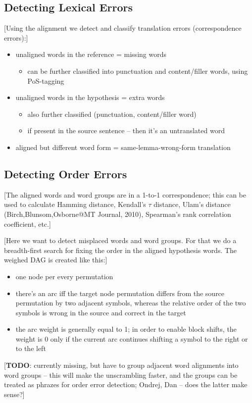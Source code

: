 \documentclass[11pt]{article}
\newcommand{\tmp}[1]{[#1]}
\newcommand{\todo}[0]{\textbf{TODO}}
\newcommand{\itemz}{\begin{itemize}}
\newcommand{\idone}{\end{itemize}}
\newcommand{\oneitem}[1]{\itemz \item #1 \idone}
\begin{document}
\subsection{Detecting Lexical Errors}

\tmp{Using the alignment we detect and classify translation errors (correspondence errors):}

\itemz
	\item unaligned words in the reference = missing words
		\oneitem{can be further classified into punctuation and content/filler words, using PoS-tagging}
	\item unaligned words in the hypothesis = extra words
	\itemz
		\item also further classified (punctuation, content/filler word)
		\item if present in the source sentence -- then it's an untranslated word
	\idone
	\item aligned but different word form = same-lemma-wrong-form translation
\idone

\subsection{Detecting Order Errors}

\tmp{The aligned words and word groups are in a 1-to-1 correspondence; this can be used to calculate Hamming
distance, Kendall's $\tau$ distance, Ulam's distance (Birch,Blunsom,Osborne@MT Journal, 2010), Spearman's rank correlation
coefficient, etc.}

\tmp{Here we want to detect misplaced words and word groups. For that we do a breadth-first search for fixing the order
in the aligned hypothesis words. The weighed DAG is created like this:}

\itemz
	\item one node per every permutation
	\item there's an arc iff the target node permutation differs from the source permutation by two adjacent symbols,
		whereas the relative order of the two symbols is wrong in the source and correct in the target
	\item the arc weight is generally equal to 1; in order to enable block shifts, the weight is 0 only if the current
		arc continues shifting a symbol to the right or to the left
\idone

\tmp{\todo{}: currently missing, but have to group adjacent word alignments into word groups -- this will make the
unscrambling faster, and the groups can be treated as phrazes for order error detection; Ondrej, Dan -- does the latter make sense?}
\end{document}
